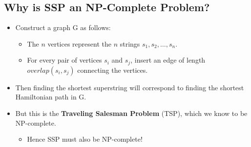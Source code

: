 \documentclass[10pt]{article}
\begin{document}
\subsection*{Why is SSP an NP-Complete Problem?}
\begin{itemize}
    \item Construct a graph G as follows:
    \begin{itemize}
        \item The $n$ vertices represent the $n$ strings $s_1, s_2, \dots, s_n$.
        \item For every pair of vertices $s_i$ and $s_j$, insert an edge of length $overlap(s_i, s_j)$ connecting the vertices.
    \end{itemize}
    \item Then finding the shortest superstring will correspond to finding the shortest Hamiltonian path in G.
    \item But this is the \textbf{Traveling Salesman Problem} (TSP), which we know to be NP-complete.
    \begin{itemize}
        \item Hence SSP must also be NP-complete!
    \end{itemize}
\end{itemize}
\end{document}
